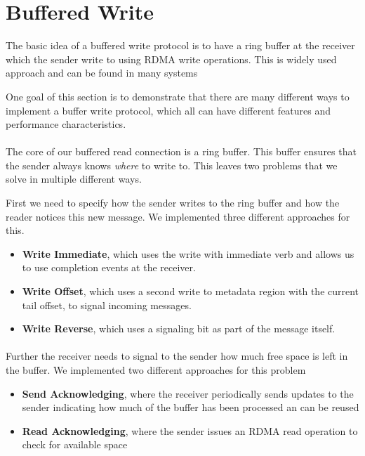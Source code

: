 \section{Buffered Write} \label{sec:conn:buf_write}

The basic idea of a buffered write protocol is to have a ring buffer at the receiver which the sender write to using
RDMA write operations. This is widely used approach and can be found in many systems~\cite{herd, scal-rdma-rpc}

One goal of this section is to demonstrate that there are many different ways to implement a buffer write 
protocol, which all can have different features and performance characteristics.


\paragraph{}The core of our buffered read connection is a ring buffer. This buffer ensures that the sender always knows 
\emph{where} to  write to. This leaves two problems that we solve in multiple different ways.

First we need to specify how the sender writes to the ring buffer and how the reader notices this new message. We 
implemented three different approaches for this. 
\begin{itemize}
  \item \textbf{Write Immediate}, which uses the write with immediate verb and allows us to use completion 
    events at the receiver.
  \item \textbf{Write Offset}, which uses a second write to metadata region with the current tail offset,
    to signal incoming messages.
  \item \textbf{Write Reverse}, which uses a signaling bit as part of the message itself.
\end{itemize}
 

\paragraph{} Further the receiver needs to signal to the sender how much free space is left in the buffer. We implemented 
two different approaches for this problem

\begin{itemize}
  \item \textbf{Send Acknowledging}, where the receiver periodically sends updates to the sender indicating how much of
    the buffer has been processed an can be reused
  \item \textbf{Read Acknowledging}, where the sender issues an RDMA read operation to check for available space 
\end{itemize}

